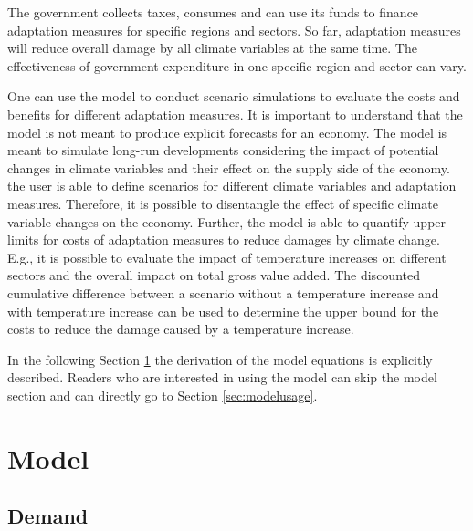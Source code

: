 \documentclass[10pt,a4paper]{article}
\begin{document}
The government collects taxes, consumes and can use its funds to finance adaptation measures for specific regions and sectors. So far, adaptation measures will reduce overall damage by all climate variables at the same time. The effectiveness of government expenditure in one specific region and sector can vary.

One can use the model to conduct scenario simulations to evaluate the costs and benefits for different adaptation measures. It is important to understand that the model is not meant to produce explicit forecasts for an economy. The model is meant to simulate long-run developments considering the impact of potential changes in climate variables and their effect on the supply side of the economy. the user is able to define scenarios for different climate variables and adaptation measures. Therefore, it is possible to disentangle the effect of specific climate variable changes on the economy. Further, the model is able to quantify upper limits for costs of adaptation measures to reduce damages by climate change. E.g., it is possible to evaluate the impact of temperature increases on different sectors and the overall impact on total gross value added. The discounted cumulative difference between a scenario without a temperature increase and with temperature increase can be used to determine the upper bound for the costs to reduce the damage caused by a temperature increase.  

In the following Section \ref{sec:modelderivation} the derivation of the model equations is explicitly described. Readers who are interested in using the model can skip the model section and can directly go to Section \ref{sec:modelusage}.

\cleardoublepage
\section{Model}\label{sec:modelderivation}
\subsection{Demand}
\end{document}
